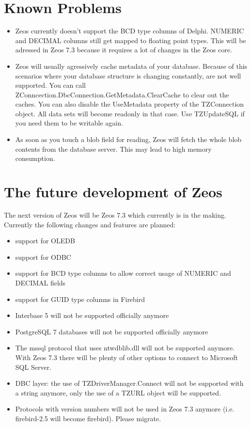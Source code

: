 \documentclass[a4paper,12pt,oneside]{article}
\begin{document}
\section{Known Problems}
\label{sec:KnownProblems}
\begin{itemize}
\item 
  Zeos currently doesn't support the BCD type columns of Delphi.
	NUMERIC and DECIMAL columns still get mapped to floating point types.
	This will be adressed in Zeos 7.3 because it requires a lot of changes in the Zeos core.
\item
  Zeos will usually agressively cache metadata of your database.
	Because of this scenarios where your database structure is changing constantly, are not well supported.
	You can call ZConncection.\-DbcConnection.\-GetMetadata.\-ClearCache to clear out the caches.
	You can also disable the UseMetadata property of the TZConnection object.
	All data sets will become readonly in that case.
	Use TZUpdateSQL if you need them to be writable again.
\item
  As soon as you touch a blob field for reading, Zeos will fetch the whole blob contents from the database server.
	This may lead to high memory consumption.
\end{itemize}

\section{The future development of Zeos}
\label{sec:FutureDevelopmentOfZeos}
The next version of Zeos will be Zeos 7.3 which currently is in the making.
Currently the following changes and features are planned:
\begin{itemize}
\item support for OLEDB
\item support for ODBC
\item support for BCD type columns to allow correct usage of NUMERIC and DECIMAL fields
\item support for GUID type columns in Firebird
\item Interbase 5 will not be supported officially anymore
\item PostgreSQL 7 databases will not be supported officially anymore
\item 
  The mssql protocol that uses ntwdblib.dll will not be supported anymore.
	With Zeos 7.3 there will be plenty of other options to connect to Microsoft SQL Server.
\item DBC layer: the use of TZDriverManager.Connect will not be supported with a string anymore, only the use of a TZURL object will be supported.
\item
  Protocols with version numbers will not be used in Zeos 7.3 anymore (i.e. firebird-2.5 will become firebird).
  Please migrate.
\end{itemize}
\end{document}
